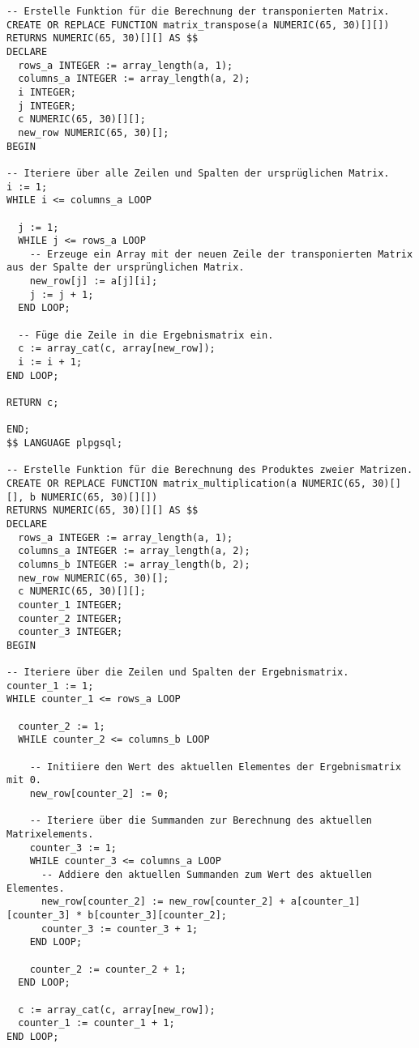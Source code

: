 \begin{verbatim}
-- Erstelle Funktion für die Berechnung der transponierten Matrix.
CREATE OR REPLACE FUNCTION matrix_transpose(a NUMERIC(65, 30)[][])
RETURNS NUMERIC(65, 30)[][] AS $$
DECLARE
  rows_a INTEGER := array_length(a, 1);
  columns_a INTEGER := array_length(a, 2);
  i INTEGER;
  j INTEGER;
  c NUMERIC(65, 30)[][];
  new_row NUMERIC(65, 30)[];
BEGIN

-- Iteriere über alle Zeilen und Spalten der ursprüglichen Matrix.
i := 1;
WHILE i <= columns_a LOOP

  j := 1;
  WHILE j <= rows_a LOOP
    -- Erzeuge ein Array mit der neuen Zeile der transponierten Matrix aus der Spalte der ursprünglichen Matrix.
    new_row[j] := a[j][i];
    j := j + 1;
  END LOOP;

  -- Füge die Zeile in die Ergebnismatrix ein.
  c := array_cat(c, array[new_row]);
  i := i + 1;
END LOOP;

RETURN c;

END;
$$ LANGUAGE plpgsql;

-- Erstelle Funktion für die Berechnung des Produktes zweier Matrizen.
CREATE OR REPLACE FUNCTION matrix_multiplication(a NUMERIC(65, 30)[][], b NUMERIC(65, 30)[][])
RETURNS NUMERIC(65, 30)[][] AS $$
DECLARE
  rows_a INTEGER := array_length(a, 1);
  columns_a INTEGER := array_length(a, 2);
  columns_b INTEGER := array_length(b, 2);
  new_row NUMERIC(65, 30)[];
  c NUMERIC(65, 30)[][];
  counter_1 INTEGER;
  counter_2 INTEGER;
  counter_3 INTEGER;
BEGIN

-- Iteriere über die Zeilen und Spalten der Ergebnismatrix.
counter_1 := 1;
WHILE counter_1 <= rows_a LOOP

  counter_2 := 1;
  WHILE counter_2 <= columns_b LOOP

    -- Initiiere den Wert des aktuellen Elementes der Ergebnismatrix mit 0.
    new_row[counter_2] := 0;

    -- Iteriere über die Summanden zur Berechnung des aktuellen Matrixelements.
    counter_3 := 1;
    WHILE counter_3 <= columns_a LOOP
      -- Addiere den aktuellen Summanden zum Wert des aktuellen Elementes.
      new_row[counter_2] := new_row[counter_2] + a[counter_1][counter_3] * b[counter_3][counter_2];
      counter_3 := counter_3 + 1;
    END LOOP;

    counter_2 := counter_2 + 1;
  END LOOP;

  c := array_cat(c, array[new_row]);
  counter_1 := counter_1 + 1;
END LOOP;


\end{verbatim}
